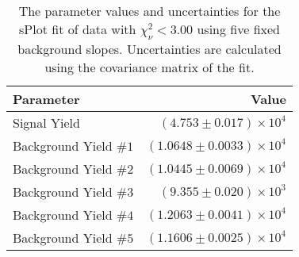
\begin{table}[ht]
    \begin{center}
        \begin{tabular}{lr}\toprule
            Parameter & Value \\\midrule
            Signal Yield & $(4.753 \pm 0.017) \times 10^{4}$ \\
            Background Yield $\#1$ & $(1.0648 \pm 0.0033) \times 10^{4}$ \\
            Background Yield $\#2$ & $(1.0445 \pm 0.0069) \times 10^{4}$ \\
            Background Yield $\#3$ & $(9.355 \pm 0.020) \times 10^{3}$ \\
            Background Yield $\#4$ & $(1.2063 \pm 0.0041) \times 10^{4}$ \\
            Background Yield $\#5$ & $(1.1606 \pm 0.0025) \times 10^{4}$ \\\bottomrule
        \end{tabular}
        \caption{The parameter values and uncertainties for the sPlot fit of data with $\chi^2_\nu < 3.00$ using five fixed background slopes. Uncertainties are calculated using the covariance matrix of the fit.}\label{tab:splot-fit-results-chisqdof-3.00-fixed-5}
    \end{center}
\end{table}
